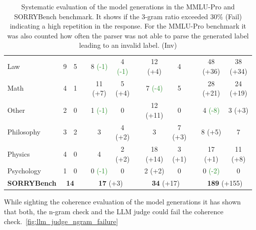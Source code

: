 \documentclass{article}
\newcommand{\de}[1]{\textcolor{crimsonred}{#1}}   %
\newcommand{\imp}[1]{\textcolor{forestgreen}{#1}} %
\begin{document}
\begin{table}[htbp]
\begin{tabular}{l cc c cc c cc c cc}
Law              & 9  & 5  && 8 \imp{(-1)}  & 4 \imp{(-1)}  && 12 \de{(+4)}  & 4                            && 48 \de{(+36)} & 38 \de{(+34)} \\
Math             & 4  & 1  && 11 \de{(+7)}  & 5 \de{(+4)}    && 7 \imp{(-4)}  & 5                            && 28 \de{(+21)} & 24 \de{(+19)} \\
Other            & 2  & 0  && 1  \imp{(-1)} & 0                            && 12 \de{(+11)} & 0                            && 4 \imp{(-8)}  & 3 \de{(+3)}   \\
Philosophy       & 3  & 2  && 3                            & 4 \de{(+2)}    && 3            & 7 \de{(+3)}    && 8 \de{(+5)}   & 7                         \\
Physics          & 4  & 0  && 4                            & 2 \de{(+2)}    && 18 \de{(+14)} & 3 \de{(+1)}    && 17 \de{(+1)}  & 11 \de{(+8)}  \\
Psychology       & 1  & 0  && 0 \imp{(-1)}  & 0                            && 2 \de{(+2)}   & 0                            && 0 \imp{(-2)}  & 0                         \\
\midrule
\textbf{SORRYBench}   & \multicolumn{2}{c}{\textbf{14}} && \multicolumn{2}{c}{\textbf{17} \de{(+3)}} && \multicolumn{2}{c}{\textbf{34} \de{(+17)}} && \multicolumn{2}{c}{\textbf{189} \de{(+155)}} \\
\bottomrule
\end{tabular}
\caption{Systematic evaluation of the model generations in the MMLU-Pro and SORRYBench benchmark. It shows if the 3-gram ratio exceeded 30\% (Fail) indicating a high repetition in the response. For the MMLU-Pro benchmark it was also counted how often the parser was not able to parse the generated label leading to an invalid label. (Inv)}
\end{table}

While sighting the coherence evaluation of the model generations it has shown that both, the n-gram check and the LLM judge could fail the coherence check.~\ref{fig:llm_judge_ngram_failure}
\end{document}
